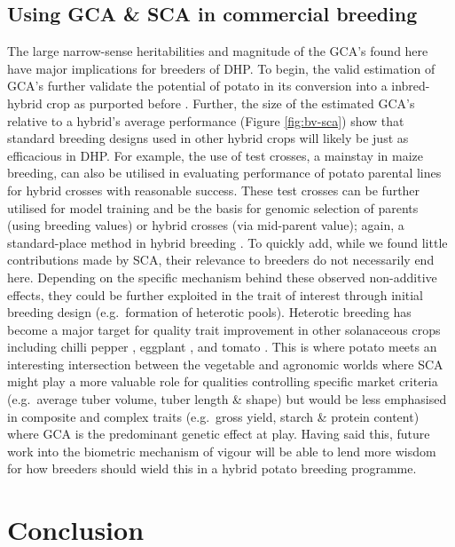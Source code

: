 \subsection{Using GCA \& SCA in commercial breeding}\label{using-gca-sca-in-commercial-breeding}

The large narrow-sense heritabilities and magnitude of the GCA's found here have major implications for breeders of DHP. To begin, the valid estimation of GCA's further validate the potential of potato in its conversion into a inbred-hybrid crop as purported before \citep{Jansky2016, Lindhout2011}. Further, the size of the estimated GCA's relative to a hybrid's average performance (Figure \ref{fig:bv-sca}) show that standard breeding designs used in other hybrid crops will likely be just as efficacious in DHP. For example, the use of test crosses, a mainstay in maize breeding, can also be utilised in evaluating performance of potato parental lines for hybrid crosses with reasonable success. These test crosses can be further utilised for model training and be the basis for genomic selection of parents (using breeding values) or hybrid crosses (via mid-parent value); again, a standard-place method in hybrid breeding \citep{Albrecht2011}. To quickly add, while we found little contributions made by SCA, their relevance to breeders do not necessarily end here. Depending on the specific mechanism behind these observed non-additive effects, they could be further exploited in the trait of interest through initial breeding design (e.g.~formation of heterotic pools). Heterotic breeding has become a major target for quality trait improvement in other solanaceous crops including chilli pepper \citep{Herath2020}, eggplant \citep{Kumar2020}, and tomato \citep{Pearson1983}. This is where potato meets an interesting intersection between the vegetable and agronomic worlds where SCA might play a more valuable role for qualities controlling specific market criteria (e.g.~average tuber volume, tuber length \& shape) but would be less emphasised in composite and complex traits (e.g.~gross yield, starch \& protein content) where GCA is the predominant genetic effect at play. Having said this, future work into the biometric mechanism of vigour will be able to lend more wisdom for how breeders should wield this in a hybrid potato breeding programme.



\section{Conclusion}\label{conclusion}

